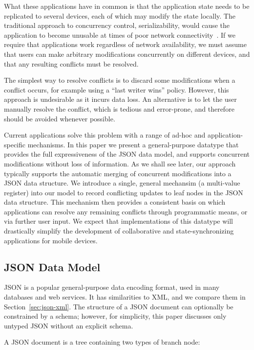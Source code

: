 \documentclass[10pt,journal,compsoc]{IEEEtran}
\begin{document}
What these applications have in common is that the application state needs to be replicated to several devices, each of which may modify the state locally. The traditional approach to concurrency control, serializability, would cause the application to become unusable at times of poor network connectivity~\cite{Davidson:1985hv}. If we require that applications work regardless of network availability, we must assume that users can make arbitrary modifications concurrently on different devices, and that any resulting conflicts must be resolved.

The simplest way to resolve conflicts is to discard some modifications when a conflict occurs, for example using a ``last writer wins'' policy. However, this approach is undesirable as it incurs data loss. An alternative is to let the user manually resolve the conflict, which is tedious and error-prone, and therefore should be avoided whenever possible.

Current applications solve this problem with a range of ad-hoc and application-specific mechanisms. In this paper we present a general-purpose datatype that provides the full expressiveness of the JSON data model, and supports concurrent modifications without loss of information. As we shall see later, our approach typically supports the automatic merging of concurrent modifications into a JSON data structure. We introduce a single, general mechansim (a multi-value register) into our model to record conflicting updates to leaf nodes in the JSON data structure. This mechanism then provides a consistent basis on which applications can resolve any remaining conflicts through programmatic means, or via further user input.  We expect that implementations of this datatype will drastically simplify the development of collaborative and state-synchronizing applications for mobile devices.

\subsection{JSON Data Model}

JSON is a popular general-purpose data encoding format, used in many databases and web services. It has similarities to XML, and we compare them in Section~\ref{sec:json-xml}. The structure of a JSON document can optionally be constrained by a schema; however, for simplicity, this paper discusses only untyped JSON without an explicit schema.

A JSON document is a tree containing two types of branch node:
\end{document}
